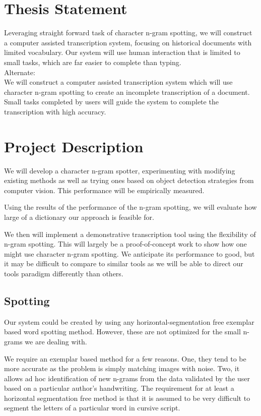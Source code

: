 \documentclass[ms]{byuprop}
\begin{document}
\section{Thesis Statement}

Leveraging straight forward task of character n-gram spotting, we will construct a computer assisted transcription system, focusing on historical documents with limited vocabulary. Our system will use human interaction that is limited to small tasks, which are far easier to complete than typing.
\\
Alternate:
\\
We will construct a computer assisted transcription system which will use character n-gram spotting to create an incomplete transcription of a document. Small tasks completed by users will guide the system to complete the transcription with high accuracy.

\section{Project Description}

We will develop a character n-gram spotter, experimenting with modifying existing methods as well as trying ones based on object detection strategies from computer vision. This performance will be empirically measured.

Using the results of the performance of the n-gram spotting, we will evaluate how large of a dictionary our approach is feasible for.

We then will implement a demonstrative transcription tool using the flexibility of n-gram spotting. This will largely be a proof-of-concept work to show how one might use character n-gram spotting. We anticipate its performance to good, but it may be difficult to compare to similar tools as we will be able to direct our tools paradigm differently than others.


\subsection{Spotting}
Our system could be created by using any  horizontal-segmentation free exemplar based word spotting method. However, these are not optimized for the small n-grams we are dealing with.

We require an exemplar based method for a few reasons. One, they tend to be more accurate as the problem is simply matching images with noise. Two, it allows ad hoc identification of new n-grams from the data validated by the user based on a particular author's handwriting. The requirement for at least a horizontal segmentation free method is that it is assumed to be very difficult to segment the letters of a particular word in cursive script.
\end{document}
